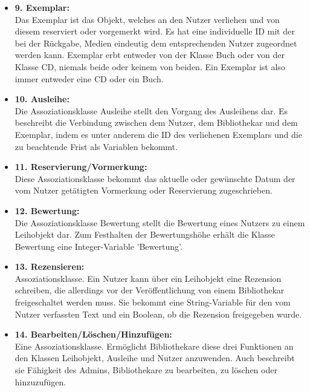 \documentclass[fontsize=12pt,paper=a4,twoside]{scrartcl}
\begin{document}
\begin{itemize}
	\item \textbf{9. Exemplar:}\\
	Das Exemplar ist das Objekt, welches an den Nutzer verliehen und von diesem reserviert oder vorgemerkt wird. Es hat eine individuelle ID mit der bei der Rückgabe, Medien eindeutig dem entsprechenden Nutzer zugeordnet werden kann. Exemplar erbt entweder von der Klasse Buch oder von der Klasse CD, niemals beide oder keinem von beiden. Ein Exemplar ist also immer entweder eine CD oder ein Buch.
	
	\item \textbf{10. Ausleihe:}\\
	Die Assoziationsklasse Ausleihe stellt den Vorgang des Ausleihens dar. Es beschreibt die Verbindung zwischen dem Nutzer, dem Bibliothekar und dem Exemplar, indem es unter anderem die ID des verliehenen Exemplars und die zu beachtende Frist als Variablen bekommt. 
	
	\item \textbf{11. Reservierung/Vormerkung:}\\
	Diese Assoziationsklasse bekommt das aktuelle oder gewünschte Datum der vom Nutzer getätigten Vormerkung oder Reservierung zugeschrieben.
	
	\item \textbf{12. Bewertung:}\\
	Die Assoziationsklasse Bewertung stellt die Bewertung eines Nutzers zu einem Leihobjekt dar. Zum Festhalten der Bewertungshöhe erhält die Klasse Bewertung eine Integer-Variable 'Bewertung'.
	
	\item \textbf{13. Rezensieren:}\\
	Assoziationsklasse. Ein Nutzer kann über ein Leihobjekt eine Rezension schreiben, die allerdings vor der Veröffentlichung von einem Bibliothekar freigeschaltet werden muss. Sie bekommt eine String-Variable für den vom Nutzer verfassten Text und ein Boolean, ob die Rezension freigegeben wurde.
	
	\item \textbf{14. Bearbeiten/Löschen/Hinzufügen:}\\
	Eine Assoziationsklasse. Ermöglicht Bibliothekare diese drei Funktionen an den Klassen Leihobjekt, Ausleihe und Nutzer anzuwenden. Auch beschreibt sie Fähigkeit des Admins, Bibliothekare zu bearbeiten, zu löschen oder hinzuzufügen. 
\end{itemize}
\end{document}

